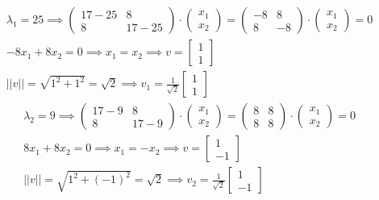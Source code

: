 \documentclass[a4paper,fleqn,12pt]{article}
\begin{document}
\begin{gather*}
\lambda_1 = 25 \implies 
\begin{pmatrix}
17-25 & 8 \\
8 & 17-25
\end{pmatrix} \cdot  
\begin{pmatrix} x_1 \\ x_2 \end{pmatrix} = 
\begin{pmatrix}
-8 & 8 \\
8 & -8
\end{pmatrix}\cdot  
\begin{pmatrix} x_1 \\ x_2 \end{pmatrix} = 0 \\
-8x_1 + 8x_2 = 0 \implies x_1 = x_2 \implies v =  \begin{bmatrix} 1 \\1 \end{bmatrix}  \\
|| v || = \sqrt{1^2 + 1^2} = \sqrt{2} \implies v_1 = \frac{1}{\sqrt{2}} \begin{bmatrix} 1 \\1 \end{bmatrix} 
\end{gather*}
\begin{gather*}
\lambda_2 = 9 \implies 
\begin{pmatrix}
17-9 & 8 \\
8 & 17-9
\end{pmatrix} \cdot  
\begin{pmatrix} x_1 \\ x_2 \end{pmatrix} = 
\begin{pmatrix}
8 & 8 \\
8 & 8
\end{pmatrix}\cdot  
\begin{pmatrix} x_1 \\ x_2 \end{pmatrix} = 0 \\
8x_1 + 8x_2 = 0 \implies x_1 = -x_2 \implies v =  \begin{bmatrix} 1 \\-1 \end{bmatrix} \\
|| v || = \sqrt{1^2 + (-1)^2} = \sqrt{2}  \implies v_2 = \frac{1}{\sqrt{2}} \begin{bmatrix} 1 \\-1 \end{bmatrix} 
\end{gather*}
\end{document}
